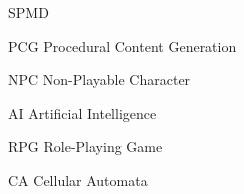 
\begin{listofabbrv}{SPMD}
  \item[PCG] Procedural Content Generation
  \item[NPC] Non-Playable Character
  \item[AI] Artificial Intelligence
  \item[RPG] Role-Playing Game
  \item[CA] Cellular Automata
\end{listofabbrv}